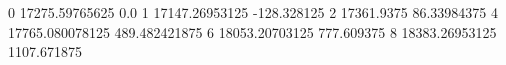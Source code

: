 0 17275.59765625 0.0
1 17147.26953125 -128.328125
2 17361.9375 86.33984375
4 17765.080078125 489.482421875
6 18053.20703125 777.609375
8 18383.26953125 1107.671875
